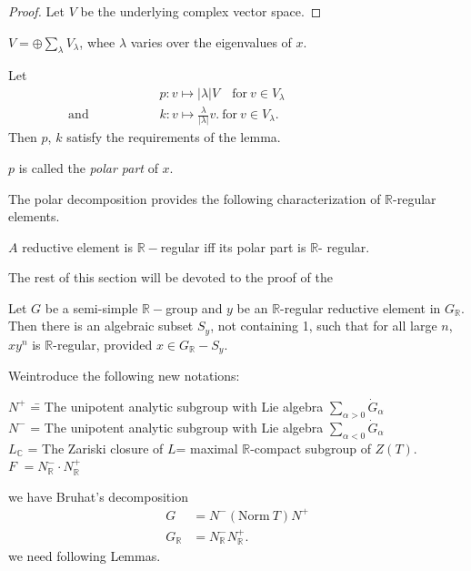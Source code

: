 \begin{proof}
  Let $V$ be the underlying complex vector space.
\end{proof}

$\displaystyle{V = \oplus \sum_{\lambda} V_\lambda}$, whee $\lambda$
  varies over the eigenvalues of $x$.

Let 
\begin{align*}
  & p: v \mapsto |\lambda |V \quad \text{for}~ v \in V_\lambda\hspace{4cm}\\
\text{and} \hspace{2cm} & k: v \mapsto \frac{\lambda}{|\lambda|} v.
~\text{for}~ v \in V_\lambda. 
\end{align*}
Then $p$, $k$ satisfy the requirements of the lemma.

\begin{defi*}
  $p$ is called the \textit{polar part} of $x$.
\end{defi*}

The polar decomposition provides the following characterization of
$\mathbb{R}$-regular elements.

\begin{prop*} 
  $A$ reductive element is $\mathbb{R}-$regular iff its polar part is
  $\mathbb{R}$- regular. 
\end{prop*}

The rest of this section will be devoted to the proof of the 
\begin{thm} \label{chap3:thm3.2}
  Let $G$ be a semi-simple $\mathbb{R}-$group and $y$ be an
  $\mathbb{R}$-regular reductive element in $G_\mathbb{R}$. Then there
  is an algebraic subset $S_y$, not containing 1, such that for all
  large $n$, $xy^n$ is $\mathbb{R}$-regular, provided $x \in
  G_\mathbb{R}- S_y$.
\end{thm}

We\pageoriginale introduce the following new notations:

\begin{tabbing}
  $N^+$ \= = The unipotent analytic subgroup with Lie algebra
  $\displaystyle{\sum_{\alpha > 0} \dot{G}_\alpha}$\\
  $N^-$ \> = The unipotent analytic subgroup with Lie algebra
  $\displaystyle{\sum_{\alpha < 0} \dot{G}_\alpha}$\\
  $L_\mathbb{C}$ \> = The Zariski closure of $L$= maximal
    $\mathbb{R}$-compact subgroup of $Z(T)$.\\
    $F$ \> $ = N^-_{\mathbb{R}}\cdot N^+_{\mathbb{R}}$ 
\end{tabbing}
we have Bruhat's decomposition
\begin{align*}
  G & = N^- (\text{Norm}~ T) N^+\\
  G_\mathbb{R} & = N^-_\mathbb{R} N^+_{\mathbb{R}}.
\end{align*}
we need following Lemmas.

